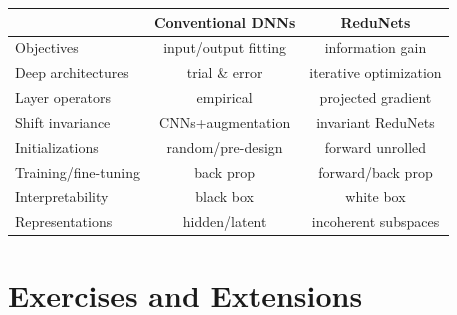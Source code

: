 \documentclass[../../book-main.tex]{subfiles}
\begin{document}
\begin{center}
\begin{tabular}{| l || c | c |}
\hline
  & Conventional DNNs & ReduNets\\ [0.5ex]
  \hline \hline
Objectives & input/output fitting & information gain\\ [0.5ex]
  \hline
Deep architectures & trial \& error & iterative optimization \\  [0.5ex]
\hline
Layer operators & empirical & projected gradient \\  [0.5ex]
\hline
Shift invariance & CNNs+augmentation & invariant ReduNets \\  [0.5ex]
\hline
Initializations & random/pre-design & forward unrolled \\ [0.5ex]
\hline
Training/fine-tuning & back prop & forward/back prop\\ [0.5ex]
\hline
Interpretability & black box & white box \\ [0.5ex]
\hline
Representations & hidden/latent & incoherent subspaces \\ [0.5ex]
\hline
\end{tabular}
\end{center}




\section{Exercises and Extensions}
\end{document}
